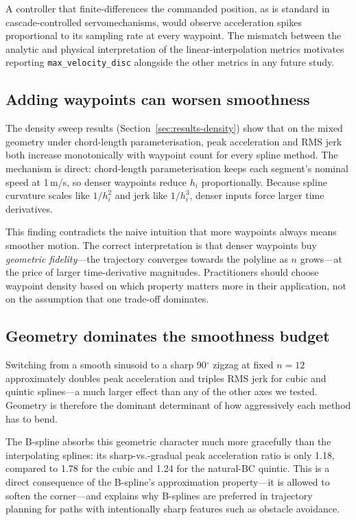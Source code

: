 A controller that finite-differences the commanded position, as is
standard in cascade-controlled servomechanisms, would observe
acceleration spikes proportional to its sampling rate at every
waypoint. The mismatch between the analytic and physical
interpretation of the linear-interpolation metrics motivates
reporting \texttt{max\_velocity\_disc} alongside the other metrics
in any future study.

\subsection{Adding waypoints can worsen smoothness}
\label{sec:disc-density}

The density sweep results
(Section~\ref{sec:results-density}) show that on the mixed geometry
under chord-length parameterisation, peak acceleration and RMS jerk
both increase monotonically with waypoint count for every spline
method. The mechanism is direct: chord-length parameterisation keeps
each segment's nominal speed at 1\,m/s, so denser waypoints reduce
$h_i$ proportionally. Because spline curvature scales like
$1/h_i^2$ and jerk like $1/h_i^3$, denser inputs force larger time
derivatives.

This finding contradicts the naive intuition that more waypoints
always means smoother motion. The correct interpretation is that
denser waypoints buy \emph{geometric fidelity}---the trajectory
converges towards the polyline as $n$ grows---at the price of
larger time-derivative magnitudes. Practitioners should choose
waypoint density based on which property matters more in their
application, not on the assumption that one trade-off dominates.

\subsection{Geometry dominates the smoothness budget}
\label{sec:disc-geometry}

Switching from a smooth sinusoid to a sharp 90$^{\circ}$ zigzag at
fixed $n=12$ approximately doubles peak acceleration and triples RMS
jerk for cubic and quintic splines---a much larger effect than any
of the other axes we tested. Geometry is therefore the dominant
determinant of how aggressively each method has to bend.

The B-spline absorbs this geometric character much more gracefully
than the interpolating splines: its sharp-vs.-gradual peak
acceleration ratio is only 1.18, compared to 1.78 for the cubic and
1.24 for the natural-BC quintic. This is a direct consequence of the
B-spline's approximation property---it is allowed to soften the
corner---and explains why B-splines are preferred in trajectory
planning for paths with intentionally sharp features such as
obstacle avoidance.

